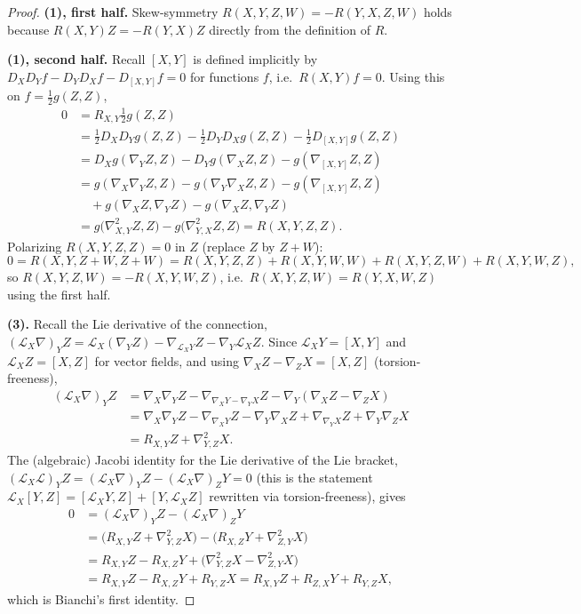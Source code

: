\begin{proof}
  \leanok
  \textbf{(1), first half.} Skew-symmetry $R(X,Y,Z,W)=-R(Y,X,Z,W)$ holds because
  $R(X,Y)Z=-R(Y,X)Z$ directly from the definition of $R$.

  \textbf{(1), second half.} Recall $[X,Y]$ is defined implicitly by
  $D_XD_Yf-D_YD_Xf-D_{[X,Y]}f=0$ for functions $f$, i.e.\ $R(X,Y)f=0$. Using this
  on $f=\tfrac12g(Z,Z)$,
  \begin{align*}
    0&=R_{X,Y}\tfrac12g(Z,Z)\\
    &=\tfrac12D_XD_Yg(Z,Z)-\tfrac12D_YD_Xg(Z,Z)-\tfrac12D_{[X,Y]}g(Z,Z)\\
    &=D_Xg(\nabla_YZ,Z)-D_Yg(\nabla_XZ,Z)-g(\nabla_{[X,Y]}Z,Z)\\
    &=g(\nabla_X\nabla_YZ,Z)-g(\nabla_Y\nabla_XZ,Z)-g(\nabla_{[X,Y]}Z,Z)\\
    &\quad+g(\nabla_XZ,\nabla_YZ)-g(\nabla_XZ,\nabla_YZ)\\
    &=g\big(\nabla^2_{X,Y}Z,Z\big)-g\big(\nabla^2_{Y,X}Z,Z\big)=R(X,Y,Z,Z).
  \end{align*}
  Polarizing $R(X,Y,Z,Z)=0$ in $Z$ (replace $Z$ by $Z+W$):
  \[
    0=R(X,Y,Z+W,Z+W)=R(X,Y,Z,Z)+R(X,Y,W,W)+R(X,Y,Z,W)+R(X,Y,W,Z),
  \]
  so $R(X,Y,Z,W)=-R(X,Y,W,Z)$, i.e.\ $R(X,Y,Z,W)=R(Y,X,W,Z)$ using the first half.

  \textbf{(3).} Recall the Lie derivative of the connection,
  $(\mathcal L_X\nabla)_YZ=\mathcal L_X(\nabla_YZ)-\nabla_{\mathcal L_XY}Z-\nabla_Y\mathcal L_XZ$.
  Since $\mathcal L_XY=[X,Y]$ and $\mathcal L_XZ=[X,Z]$ for vector fields, and using
  $\nabla_XZ-\nabla_ZX=[X,Z]$ (torsion-freeness),
  \begin{align*}
    (\mathcal L_X\nabla)_YZ
    &=\nabla_X\nabla_YZ-\nabla_{\nabla_XY-\nabla_YX}Z-\nabla_Y(\nabla_XZ-\nabla_ZX)\\
    &=\nabla_X\nabla_YZ-\nabla_{\nabla_XY}Z-\nabla_Y\nabla_XZ
      +\nabla_{\nabla_YX}Z+\nabla_Y\nabla_ZX\\
    &=R_{X,Y}Z+\nabla^2_{Y,Z}X.
  \end{align*}
  The (algebraic) Jacobi identity for the Lie derivative of the Lie bracket,
  $(\mathcal L_X\mathcal L)_YZ=(\mathcal L_X\nabla)_YZ-(\mathcal L_X\nabla)_ZY=0$
  (this is the statement $\mathcal L_X[Y,Z]=[\mathcal L_XY,Z]+[Y,\mathcal L_XZ]$
  rewritten via torsion-freeness), gives
  \begin{align*}
    0&=(\mathcal L_X\nabla)_YZ-(\mathcal L_X\nabla)_ZY\\
    &=\big(R_{X,Y}Z+\nabla^2_{Y,Z}X\big)-\big(R_{X,Z}Y+\nabla^2_{Z,Y}X\big)\\
    &=R_{X,Y}Z-R_{X,Z}Y+\big(\nabla^2_{Y,Z}X-\nabla^2_{Z,Y}X\big)\\
    &=R_{X,Y}Z-R_{X,Z}Y+R_{Y,Z}X=R_{X,Y}Z+R_{Z,X}Y+R_{Y,Z}X,
  \end{align*}
  which is Bianchi's first identity.


\end{proof}
